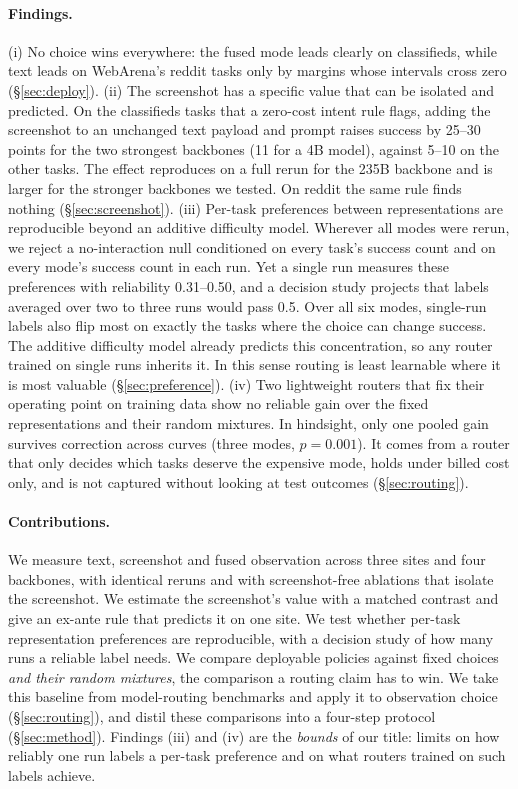 \paragraph{Findings.}
(i) No choice wins everywhere: the fused mode leads clearly on classifieds, while text leads on WebArena's reddit tasks only by margins whose intervals cross zero (\S\ref{sec:deploy}).
(ii) The screenshot has a specific value that can be isolated and predicted. On the classifieds tasks that a zero-cost intent rule flags, adding the screenshot to an unchanged text payload and prompt raises success by 25--30 points for the two strongest backbones (11 for a 4B model), against 5--10 on the other tasks. The effect reproduces on a full rerun for the 235B backbone and is larger for the stronger backbones we tested. On reddit the same rule finds nothing (\S\ref{sec:screenshot}).
(iii) Per-task preferences between representations are reproducible beyond an additive difficulty model. Wherever all modes were rerun, we reject a no-interaction null conditioned on every task's success count and on every mode's success count in each run. Yet a single run measures these preferences with reliability 0.31--0.50, and a decision study projects that labels averaged over two to three runs would pass 0.5. Over all six modes, single-run labels also flip most on exactly the tasks where the choice can change success. The additive difficulty model already predicts this concentration, so any router trained on single runs inherits it. In this sense routing is least learnable where it is most valuable (\S\ref{sec:preference}).
(iv) Two lightweight routers that fix their operating point on training data show no reliable gain over the fixed representations and their random mixtures. In hindsight, only one pooled gain survives correction across curves (three modes, $p=0.001$). It comes from a router that only decides which tasks deserve the expensive mode, holds under billed cost only, and is not captured without looking at test outcomes (\S\ref{sec:routing}).

\paragraph{Contributions.}
We measure text, screenshot and fused observation across three sites and four backbones, with identical reruns and with screenshot-free ablations that isolate the screenshot. We estimate the screenshot's value with a matched contrast and give an ex-ante rule that predicts it on one site. We test whether per-task representation preferences are reproducible, with a decision study of how many runs a reliable label needs. We compare deployable policies against fixed choices \emph{and their random mixtures}, the comparison a routing claim has to win. We take this baseline from model-routing benchmarks and apply it to observation choice (\S\ref{sec:routing}), and distil these comparisons into a four-step protocol (\S\ref{sec:method}). Findings (iii) and (iv) are the \emph{bounds} of our title: limits on how reliably one run labels a per-task preference and on what routers trained on such labels achieve.
